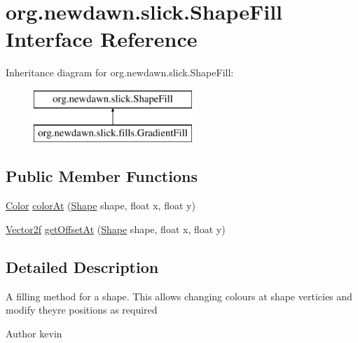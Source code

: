 \hypertarget{interfaceorg_1_1newdawn_1_1slick_1_1_shape_fill}{}\section{org.\+newdawn.\+slick.\+Shape\+Fill Interface Reference}
\label{interfaceorg_1_1newdawn_1_1slick_1_1_shape_fill}
Inheritance diagram for org.\+newdawn.\+slick.\+Shape\+Fill\+:\begin{figure}[H]
\begin{center}
\leavevmode
\includegraphics[height=2.000000cm]{interfaceorg_1_1newdawn_1_1slick_1_1_shape_fill}
\end{center}
\end{figure}
\subsection*{Public Member Functions}
\begin{DoxyCompactItemize}
\item 
\mbox{\hyperlink{classorg_1_1newdawn_1_1slick_1_1_color}{Color}} \mbox{\hyperlink{interfaceorg_1_1newdawn_1_1slick_1_1_shape_fill_ab66b4bea0c4838e5671011f1164ddb19}{color\+At}} (\mbox{\hyperlink{classorg_1_1newdawn_1_1slick_1_1geom_1_1_shape}{Shape}} shape, float x, float y)
\item 
\mbox{\hyperlink{classorg_1_1newdawn_1_1slick_1_1geom_1_1_vector2f}{Vector2f}} \mbox{\hyperlink{interfaceorg_1_1newdawn_1_1slick_1_1_shape_fill_a69e6925507e29563315971c2bc326767}{get\+Offset\+At}} (\mbox{\hyperlink{classorg_1_1newdawn_1_1slick_1_1geom_1_1_shape}{Shape}} shape, float x, float y)
\end{DoxyCompactItemize}


\subsection{Detailed Description}
A filling method for a shape. This allows changing colours at shape verticies and modify they\textquotesingle{}re positions as required

\begin{DoxyAuthor}{Author}
kevin 
\end{DoxyAuthor}


